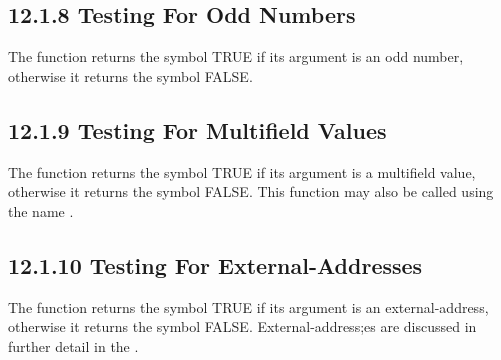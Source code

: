 \documentclass[letterpaper,10pt,english]{sphinxmanual}
\begin{document}

\begin{sphinxVerbatim}[commandchars=\\\{\}]
 
\end{sphinxVerbatim}


\subsection{12.1.8 Testing For Odd Numbers}
\label{\detokenize{actions:testing-for-odd-numbers}}
The  function returns the symbol TRUE if its argument is an odd
number, otherwise it returns the symbol FALSE.


\begin{sphinxVerbatim}[commandchars=\\\{\}]
 
\end{sphinxVerbatim}


\subsection{12.1.9 Testing For Multifield Values}
\label{\detokenize{actions:testing-for-multifield-values}}
The  function returns the symbol TRUE if its argument is
a multifield value, otherwise it returns the symbol FALSE. This function
may also be called using the name .


\begin{sphinxVerbatim}[commandchars=\\\{\}]
 
\end{sphinxVerbatim}


\subsection{12.1.10 Testing For External-Addresses}
\label{\detokenize{actions:testing-for-external-addresses}}
The  function returns the symbol TRUE if its argument is an
external-address, otherwise it returns the symbol FALSE.
External-address;es are discussed in further detail in the .
\end{document}
